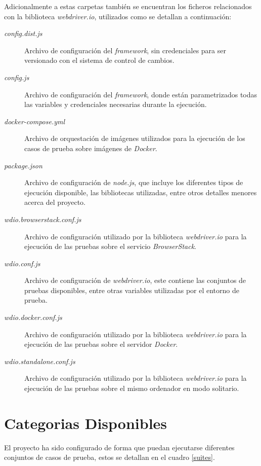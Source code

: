 Adicionalmente a estas carpetas también se encuentran los ficheros relacionados
con la biblioteca \emph{webdriver.io}, utilizados como se detallan a
continuación:

\begin{description}
    \item [\emph{config.dist.js}] Archivo de configuración del \emph{framework},
    sin credenciales para ser versionado con el sistema de control de cambios.
\item [\emph{config.js}] Archivo de configuración del \emph{framework}, donde
    están parametrizados todas las variables y credenciales necesarias durante
    la ejecución.
\item [\emph{docker-compose.yml}] Archivo de orquestación de imágenes utilizados
    para la ejecución de los casos de prueba sobre imágenes de \emph{Docker}.
\item [\emph{package.json}] Archivo de configuración de \emph{node.js}, que
    incluye los diferentes tipos de ejecución disponible, las bibliotecas
    utilizadas, entre otros detalles menores acerca del proyecto.
\item [\emph{wdio.browserstack.conf.js}] Archivo de configuración utilizado por
    la biblioteca \emph{webdriver.io} para la ejecución de las pruebas sobre el
    servicio \emph{BrowserStack}.
\item [\emph{wdio.conf.js}] Archivo de configuración de \emph{webdriver.io},
    este contiene las conjuntos de pruebas disponibles, entre otras variables
    utilizadas por el entorno de prueba.
\item [\emph{wdio.docker.conf.js}] Archivo de configuración utilizado por la
    biblioteca \emph{webdriver.io} para la ejecución de las pruebas sobre el
    servidor \emph{Docker}.
\item [\emph{wdio.standalone.conf.js}] Archivo de configuración utilizado por la
    biblioteca \emph{webdriver.io} para la ejecución de las pruebas sobre el
    mismo ordenador en modo solitario.
\end{description}

\section{Categorias Disponibles}
El proyecto ha sido configurado de forma que puedan ejecutarse diferentes
conjuntos de casos de prueba, estos se detallan en el cuadro \ref{suites}.


